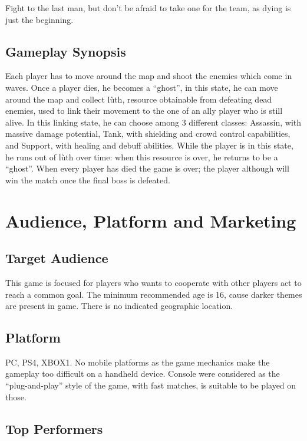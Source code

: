 \documentclass[12pt]{article}
\begin{document}
Fight to the last man, but don't be afraid to take one for the team, as dying is just the beginning.

\subsection{Gameplay Synopsis}

Each player has to move around the map and shoot the enemies which come in waves. Once a player dies, he becomes a “ghost”, in this state, he can move around the map and collect lùth, resource obtainable from defeating dead enemies, used to link their movement to the one of an ally player who is still alive. In this linking state, he can choose among 3 different classes: Assassin, with massive damage potential, Tank, with shielding and crowd control capabilities, and Support, with healing and debuff abilities. While the player is in this state, he runs out of lùth over time: when this resource is over, he returns to be a “ghost”. When every player has died the game is over; the player although will win the match once the final boss is defeated.

\newpage

\section{Audience, Platform and Marketing}

\subsection{Target Audience}

This game is focused for players who wants to cooperate with other players act to reach a common goal. The minimum recommended age is 16, cause darker themes are present in game. There is no indicated geographic location.

\subsection{Platform}

PC, PS4, XBOX1. No mobile platforms as the game mechanics make the gameplay too difficult on a handheld device. Console were considered as the “plug-and-play” style of the game, with fast matches, is suitable to be played on those.

\subsection{Top Performers}
\end{document}
